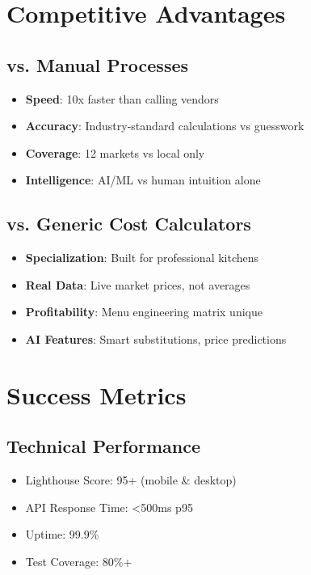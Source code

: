\documentclass[11pt,a4paper]{article}
\begin{document}
\section{Competitive Advantages}

\subsection{vs. Manual Processes}
\begin{itemize}
    \item \textbf{Speed}: 10x faster than calling vendors
    \item \textbf{Accuracy}: Industry-standard calculations vs guesswork
    \item \textbf{Coverage}: 12 markets vs local only
    \item \textbf{Intelligence}: AI/ML vs human intuition alone
\end{itemize}

\subsection{vs. Generic Cost Calculators}
\begin{itemize}
    \item \textbf{Specialization}: Built for professional kitchens
    \item \textbf{Real Data}: Live market prices, not averages
    \item \textbf{Profitability}: Menu engineering matrix unique
    \item \textbf{AI Features}: Smart substitutions, price predictions
\end{itemize}

\section{Success Metrics}

\subsection{Technical Performance}
\begin{itemize}
    \item Lighthouse Score: 95+ (mobile \& desktop)
    \item API Response Time: <500ms p95
    \item Uptime: 99.9\%
    \item Test Coverage: 80\%+
\end{itemize}
\end{document}
